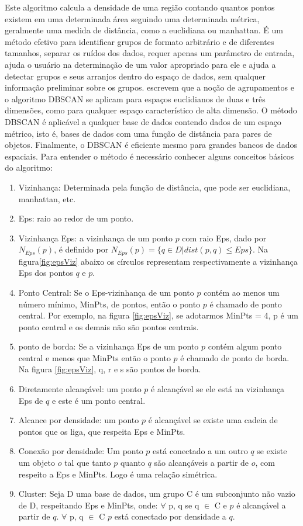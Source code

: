 Este algoritmo calcula a densidade de uma região contando quantos pontos existem em uma determinada área seguindo uma determinada métrica, geralmente uma medida de distância, como a euclidiana ou manhattan. 
É um método efetivo para identificar grupos de formato arbitrário e de diferentes tamanhos, separar os ruídos dos dados, requer apenas um parâmetro de entrada, ajuda o usuário na determinação de um valor apropriado para ele e ajuda a detectar grupos e seus arranjos dentro do espaço de dados, sem qualquer informação preliminar sobre os grupos.
\cite{ESTER1996}  escrevem que a noção de agrupamentos e o algoritmo DBSCAN se aplicam para espaços euclidianos de duas e três dimensões, como para qualquer espaço característico de alta dimensão. O método DBSCAN é aplicável a qualquer base de dados contendo dados de um espaço métrico, isto é, bases de dados com uma função de distância para pares de objetos. Finalmente, o DBSCAN é eficiente mesmo para grandes bancos de dados espaciais.
Para entender o método é necessário conhecer alguns conceitos básicos do algoritmo: 

\begin{enumerate}
	\item Vizinhança: Determinada pela função de distância, que pode ser euclidiana, manhattan, etc.
	\item Eps: raio ao redor de um ponto. 
	\item Vizinhança Eps: a vizinhança de um ponto ${p}$ com raio Eps, dado por ${N_{Eps}(p)}$, é definido por ${N_{Eps}(p) = \big\{ q \in D | dist(p, q)  \leqslant Eps\big\} }$. Na figura\ref{fig:epsViz} abaixo os círculos representam respectivamente a vizinhança Eps dos pontos ${q}$ e ${p}$.
	\item Ponto Central: Se o Eps-vizinhança de um ponto ${p}$ contém ao menos um número mínimo, MinPts, de pontos, então o ponto ${p}$ é chamado de ponto central.
	Por exemplo, na figura \ref{fig:epsViz}, se adotarmos MinPts = 4, p é um ponto central e os demais não são pontos centrais.
	\item ponto de borda: Se a vizinhança Eps de um ponto ${p}$ contém algum ponto central e menos que MinPts então o ponto ${p}$ é chamado de ponto de borda. Na figura  \ref{fig:epsViz}, q, r e s são pontos de borda.
	\item Diretamente alcançável: um ponto ${p}$ é alcançável se ele está na vizinhança Eps de ${q}$ e este é um ponto central.
	\item Alcance por densidade: um ponto ${p}$ é alcançável se existe uma cadeia de pontos que os liga, que respeita Eps e MinPts.
	\item Conexão por densidade: Um ponto ${p}$ está conectado a um outro ${q}$ se existe um objeto ${o}$ tal que tanto ${p}$ quanto ${q}$ são alcançáveis a partir de ${o}$, com respeito a Eps e MinPts. Logo é uma relação simétrica.
	\item Cluster: Seja D uma base de dados, um grupo C é um subconjunto não vazio de D, respeitando Eps e MinPts, onde:
		\subitem ${\forall}$ p, q se q ${\in}$ C e ${p}$ é alcançável a partir de ${q}$.
		\subitem ${\forall}$ p, q ${\in}$ C ${p}$ está conectado por densidade a ${q}$.
\end{enumerate}

